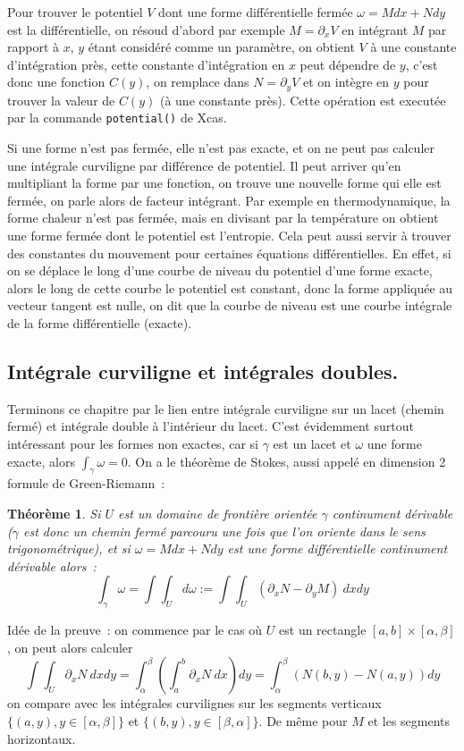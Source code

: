 \documentclass[a4paper,11pt]{article}
\newtheorem{thm}{Théorème}
\begin{document}
Pour trouver le potentiel 
$V$ dont une forme diff\'erentielle ferm\'ee
$\omega=M dx+Ndy$ est la diff\'erentielle, on r\'esoud d'abord par exemple 
$ M = \partial_x V $
en int\'egrant $M$ par rapport \`a $x$, $y$ \'etant consid\'er\'e
comme un param\`etre, on obtient $V$ \`a une constante d'int\'egration
pr\`es, cette constante d'int\'egration en $x$ peut d\'ependre
de $y$, c'est donc une fonction $C(y)$, 
on remplace dans $N=\partial_y V$ et on int\`egre
en $y$ pour trouver la valeur de $C(y)$ (\`a une constante pr\`es).
Cette op\'eration est execut\'ee par la commande \verb|potential()|
de Xcas.

Si une forme n'est pas ferm\'ee, elle n'est pas exacte, et on ne peut
pas calculer une int\'egrale curviligne par diff\'erence de potentiel.
Il peut arriver qu'en multipliant la forme par une fonction, on trouve
une nouvelle forme qui elle est ferm\'ee, on parle alors de facteur
int\'egrant. Par exemple en thermodynamique, la forme chaleur
n'est pas ferm\'ee, mais en divisant par la temp\'erature on
obtient une forme ferm\'ee dont le potentiel est l'entropie.
Cela peut aussi servir \`a trouver des constantes du mouvement
pour certaines \'equations diff\'erentielles. En effet, si on
se d\'eplace le long d'une courbe de niveau du potentiel
d'une forme exacte, alors le long de cette courbe le potentiel
est constant, donc la forme appliqu\'ee au vecteur tangent
est nulle, on dit que la courbe de niveau est une courbe
int\'egrale de la forme diff\'erentielle (exacte).

\subsection{Int\'egrale curviligne et int\'egrales doubles.}
Terminons ce chapitre par le lien entre int\'egrale curviligne
sur un lacet (chemin ferm\'e) et int\'egrale double \`a l'int\'erieur 
du lacet. C'est \'evidemment surtout int\'eressant pour les
formes non exactes, car si $\gamma$ est un lacet et $\omega$
une forme exacte, alors $\int_\gamma \omega=0$.
On a le th\'eor\`eme de Stokes, 
aussi appel\'e en dimension 2 
formule de Green-Riemann~:
\begin{thm}
Si $U$ est un domaine de fronti\`ere orient\'ee
$\gamma$ continument d\'erivable 
($\gamma$ est donc un chemin ferm\'e parcouru une fois que
l'on oriente dans le sens trigonom\'etrique), et si 
$\omega=Mdx + N dy$ est une forme
diff\'erentielle continument d\'erivable alors~:
$$ \int_\gamma \omega = \int\int_U d\omega := 
\int \int_U (\partial_x N -\partial_y M) \ dx dy$$
\end{thm}
Id\'ee de la preuve~: on commence par le cas o\`u $U$ est un
rectangle $[a,b] \times [\alpha,\beta]$, on peut alors calculer 
$$ \int \int_U \partial_x N  \ dx dy 
= \int_\alpha^\beta (\int_a^b \partial_x N  \ dx) dy
= \int_\alpha^\beta (N(b,y)-N(a,y)) dy $$
on compare avec les int\'egrales curvilignes sur les segments verticaux
$\{(a,y), y \in [\alpha,\beta]\}$ et $\{(b,y), y \in [\beta,\alpha]\}$.
De m\^eme pour $M$ et les segments horizontaux.
\end{document}
